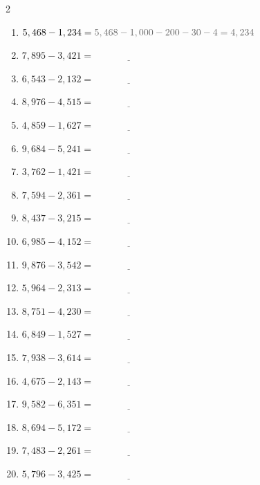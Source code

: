 \documentclass{article}
\begin{document}
\begin{multicols}{2}
\begin{enumerate}[label=\textbf{\arabic*.}, itemsep=1.5em, leftmargin=2em]
  \item $5,468 - 1,234 = {\color{subtext}5,468 - 1,000 - 200 - 30 - 4 = 4,234}$
  \item $7,895 - 3,421 = \underline{\hspace{3cm}}$
  \item $6,543 - 2,132 = \underline{\hspace{3cm}}$
  \item $8,976 - 4,515 = \underline{\hspace{3cm}}$
  \item $4,859 - 1,627 = \underline{\hspace{3cm}}$
  \item $9,684 - 5,241 = \underline{\hspace{3cm}}$
  \item $3,762 - 1,421 = \underline{\hspace{3cm}}$
  \item $7,594 - 2,361 = \underline{\hspace{3cm}}$
  \item $8,437 - 3,215 = \underline{\hspace{3cm}}$
  \item $6,985 - 4,152 = \underline{\hspace{3cm}}$
  \item $9,876 - 3,542 = \underline{\hspace{3cm}}$
  \item $5,964 - 2,313 = \underline{\hspace{3cm}}$
  \item $8,751 - 4,230 = \underline{\hspace{3cm}}$
  \item $6,849 - 1,527 = \underline{\hspace{3cm}}$
  \item $7,938 - 3,614 = \underline{\hspace{3cm}}$
  \item $4,675 - 2,143 = \underline{\hspace{3cm}}$
  \item $9,582 - 6,351 = \underline{\hspace{3cm}}$
  \item $8,694 - 5,172 = \underline{\hspace{3cm}}$
  \item $7,483 - 2,261 = \underline{\hspace{3cm}}$
  \item $5,796 - 3,425 = \underline{\hspace{3cm}}$
\end{enumerate}
\end{multicols}
\end{document}
